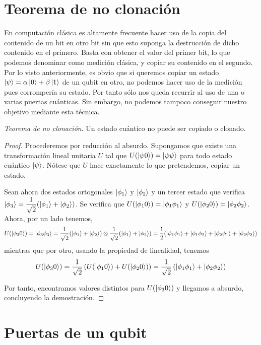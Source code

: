 \section{Teorema de no clonación}
En computación clásica es altamente frecuente hacer uso de la copia del contenido de un bit en otro bit sin que esto suponga la destrucción de dicho contenido en el primero. Basta con obtener el valor del primer bit, lo que podemos denominar como medición clásica, y copiar su contenido en el segundo. Por lo visto anteriormente, es obvio que si queremos copiar un estado $\left|\psi\right\rangle=\alpha\left|0\right\rangle+\beta\left|1\right\rangle$ de un qubit en otro, no podemos hacer uso de la medición pues corrompería su estado. Por tanto sólo nos queda recurrir al uso de una o varias puertas cuánticas. Sin embargo, no podemos tampoco conseguir nuestro objetivo mediante esta técnica.

\begin{thm} \textit{Teorema de no clonación}. Un estado cuántico no puede ser copiado o clonado.
\begin{proof}
Procederemos por reducción al absurdo. Supongamos que existe una transformación lineal unitaria $U$ tal que $U(\left|\psi0\right\rangle)=\left|\psi\psi\right\rangle$ para todo estado cuántico $\left|\psi\right\rangle$. Nótese que $U$ hace exactamente lo que pretendemos, copiar un estado.

Sean ahora dos estados ortogonales $\left|\phi_1\right\rangle$ y $\left|\phi_2\right\rangle$ y un tercer estado que verifica $\left|\phi_3\right\rangle=\dfrac{1}{\sqrt{2}}(\left|\phi_1\right\rangle+\left|\phi_2\right\rangle)$. Se verifica que $U(\left|\phi_10\right\rangle)=\left|\phi_1\phi_1\right\rangle$ y $U(\left|\phi_20\right\rangle)=\left|\phi_2\phi_2\right\rangle$. Ahora, por un lado tenemos,
\[U(\left|\phi_30\right\rangle)=\left|\phi_3\phi_3\right\rangle=\dfrac{1}{\sqrt{2}}(\left|\phi_1\right\rangle+\left|\phi_2\right\rangle)\otimes\dfrac{1}{\sqrt{2}}(\left|\phi_1\right\rangle+\left|\phi_2\right\rangle)=\dfrac{1}{2}(\left|\phi_1\phi_1\right\rangle+\left|\phi_1\phi_2\right\rangle+\left|\phi_2\phi_1\right\rangle+\left|\phi_2\phi_2\right\rangle)\]
%
mientras que por otro, usando la propiedad de linealidad, tenemos
\[U(\left|\phi_30\right\rangle)=\dfrac{1}{\sqrt{2}}\left(U(\left|\phi_10\right\rangle)+U(\left|\phi_20\right\rangle)\right)=\dfrac{1}{\sqrt{2}}\left(\left|\phi_1\phi_1\right\rangle+\left|\phi_2\phi_2\right\rangle\right)\]

Por tanto, encontramos valores distintos para $U(\left|\phi_30\right\rangle)$ y llegamos a absurdo, concluyendo la demostración.
\end{proof}
\end{thm}

\section{Puertas de un qubit}

